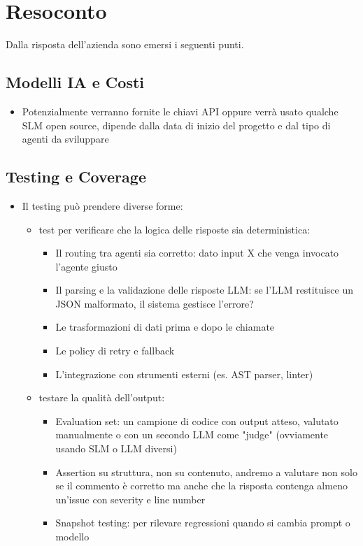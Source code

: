 \section{Resoconto}
Dalla risposta dell'azienda sono emersi i seguenti punti.

\subsection{Modelli IA e Costi}
\begin{itemize}
	\item Potenzialmente verranno fornite le chiavi API oppure verrà usato qualche SLM open source, dipende dalla data di inizio del progetto e dal tipo di agenti da sviluppare
\end{itemize}

\subsection{Testing e Coverage}
\begin{itemize}
	\item Il testing può prendere diverse forme:
		\begin{itemize}
			\item test per verificare che la logica delle risposte sia deterministica:
				\begin{itemize}
					\item Il routing tra agenti sia corretto: dato input X che venga invocato l'agente giusto
					\item Il parsing e la validazione delle risposte LLM: se l'LLM restituisce un JSON malformato, il sistema gestisce l'errore?
					\item Le trasformazioni di dati prima e dopo le chiamate
					\item Le policy di retry e fallback
					\item L'integrazione con strumenti esterni (es. AST parser, linter)
				\end{itemize}
			\item testare la qualità dell'output:
				\begin{itemize}
					\item Evaluation set: un campione di codice con output atteso, valutato manualmente o con un secondo LLM come "judge" (ovviamente usando SLM o LLM diversi)
					\item Assertion su struttura, non su contenuto, andremo a valutare non solo se il commento è corretto ma anche che la risposta contenga almeno un'issue con severity e line number
					\item Snapshot testing: per rilevare regressioni quando si cambia prompt o modello
				\end{itemize}
		\end{itemize}
\end{itemize}

